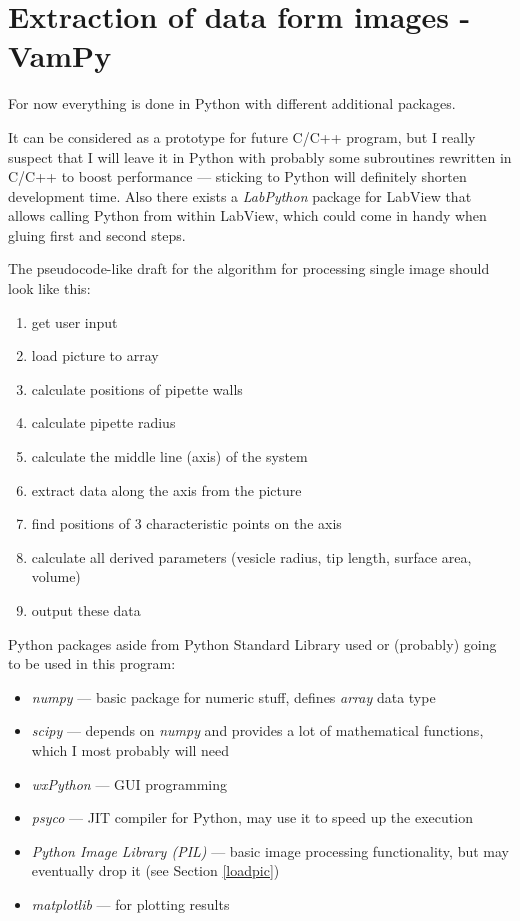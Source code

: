 \documentclass[a4paper,12pt]{article}
\begin{document}
\section{Extraction of data form images - VamPy}\label{data}

For now everything is done in Python with different additional packages.

It can be considered as a prototype for future C/C++ program, but I really suspect that I will leave it in Python with probably some subroutines rewritten in C/C++ to boost performance --- sticking to Python will definitely shorten development time. Also there exists a \emph{LabPython} package for LabView that allows calling Python from within LabView, which could come in handy when gluing first and second steps.

The pseudocode-like draft for the algorithm for processing single image should look like this:
\begin{enumerate}
  \item get user input
  \item load picture to array
  \item calculate positions of pipette walls
  \item calculate pipette radius
  \item calculate the middle line (axis) of the system
  \item extract data along the axis from the picture
  \item find positions of 3 characteristic points on the axis
  \item calculate all derived parameters (vesicle radius, tip length, surface area, volume)
  \item output these data
\end{enumerate}

Python packages aside from Python Standard Library used or (probably) going to be used in this program:
\begin{itemize}
	\item \emph{numpy} --- basic package for numeric stuff, defines \emph{array} data type
	\item \emph{scipy} --- depends on \emph{numpy} and provides a lot of mathematical functions, which I most probably will need \cite{scipy}
	\item \emph{wxPython} --- GUI programming
	\item \emph{psyco} --- JIT compiler for Python, may use it to speed up the execution
	\item \emph{Python Image Library (PIL)} --- basic image processing functionality, but may eventually drop it (see Section \ref{loadpic})
	\item \emph{matplotlib} --- for plotting results
\end{itemize}
\end{document}
